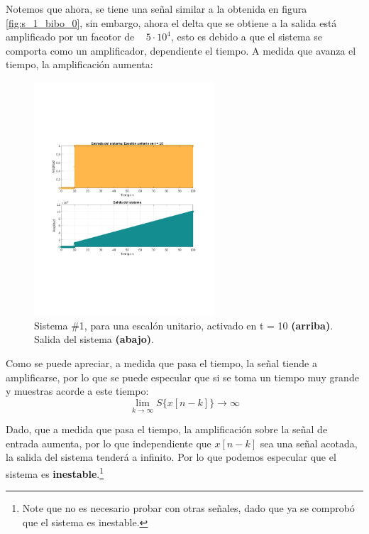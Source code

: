 			Notemos que ahora, se tiene una señal similar a la obtenida en figura \ref{fig:s_1_bibo_0}, sin embargo, ahora el delta que se obtiene a la salida está amplificado por un facotor de ~ $5 \cdot 10^{4}$, esto es debido a que el sistema se comporta como un amplificador, dependiente el tiempo. A medida que avanza el tiempo, la amplificación aumenta:
			\begin{figure}[H]
				\center
				\includegraphics[width=0.6\textwidth,clip, trim = {2cm 7.0cm 2.2cm 7.0cm}]{../imgs/sistema_1_bibo_step.pdf}
				\caption{Sistema \#1, para una escalón unitario, activado en t = 10 \textbf{(arriba)}. Salida del sistema \textbf{(abajo)}.}
				\label{fig:s_1_bibo_step}
			\end{figure}
			
			Como se puede apreciar, a medida que pasa el tiempo, la señal tiende a amplificarse, por lo que se puede especular que si se toma un tiempo muy grande y muestras acorde a este tiempo:
			\begin{equation}
			\lim_{k \rightarrow \infty}  S\{ x[n -k] \} \rightarrow \infty  
			\end{equation}
			
			Dado, que a medida que pasa el tiempo, la amplificación sobre la señal de entrada aumenta, por lo que independiente que $x[n-k]$ sea una señal acotada, la salida del sistema tenderá a infinito. Por lo que podemos especular que el sistema es \textbf{inestable}.\footnote{Note que no es necesario probar con otras señales, dado que ya se comprobó que el sistema es inestable.}
			
\newpage

